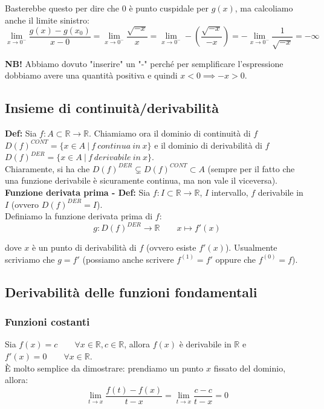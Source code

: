 \documentclass{article}
\begin{document}
\noindent Basterebbe questo per dire che $0$ è punto cuspidale per $g(x)$, ma calcoliamo anche il limite sinistro:
\begin{equation*}
    \lim_{x \to 0^-} \frac{g(x) - g(x_0)}{x - 0} = \lim_{x \to 0^-} \frac{\sqrt{-x}}{x} = \lim_{x \to 0^-} -\left(\frac{\sqrt{-x}}{-x}\right) = - \lim_{x \to 0^-} \frac{1}{\sqrt{-x}} = -\infty
\end{equation*}

\noindent\textbf{NB!} Abbiamo dovuto "inserire" un "-" perché per semplificare l'espressione dobbiamo avere una quantità positiva e quindi $x < 0 \implies -x > 0$.

\subsection{Insieme di continuità/derivabilità}
\textbf{Def:} Sia $f: A \subset \mathbb{R} \xrightarrow{} \mathbb{R}$. Chiamiamo ora il dominio di continuità di $f$ $D(f)^{CONT} = \{x \in A \ | \ f \ continua \ in \ x \}$ e il dominio di derivabilità di $f$ $D(f)^{DER} = \{x \in A \ | \ f \ derivabile \ in \ x \}$.\\
Chiaramente, si ha che $D(f)^{DER} \subsetneq D(f)^{CONT} \subset A$ (sempre per il fatto che una funzione derivabile è sicuramente continua, ma non vale il viceversa).\\

\noindent\textbf{Funzione derivata prima - Def:} Sia $f: I \subset \mathbb{R} \xrightarrow{} \mathbb{R}$, $I$ intervallo, $f$ derivabile in $I$ (ovvero $D(f)^{DER} = I$).\\
Definiamo la funzione derivata prima di $f$: 
\begin{equation*}
    g: D(f)^{DER} \xrightarrow{} \mathbb{R} \qquad x \longmapsto f'(x)
\end{equation*}

\noindent dove $x$ è un punto di derivabilità di $f$ (ovvero esiste $f'(x)$). Usualmente scriviamo che $g = f'$ (possiamo anche scrivere $f^{(1)} = f'$ oppure che $f^{(0)} = f$).

\subsection{Derivabilità delle funzioni fondamentali}
\subsubsection{Funzioni costanti}
Sia $f(x) = c \qquad \forall x \in \mathbb{R}, c \in \mathbb{R}$, allora $f(x)$ è derivabile in $\mathbb{R}$ e $f'(x) = 0 \qquad \forall x \in \mathbb{R}$.\\
È molto semplice da dimostrare: prendiamo un punto $x$ fissato del dominio, allora:
\begin{equation*}
    \lim_{t \to x} \frac{f(t) - f(x)}{t - x} = \lim_{t \to x} \frac{c - c}{t - x} = 0
\end{equation*}
\end{document}
